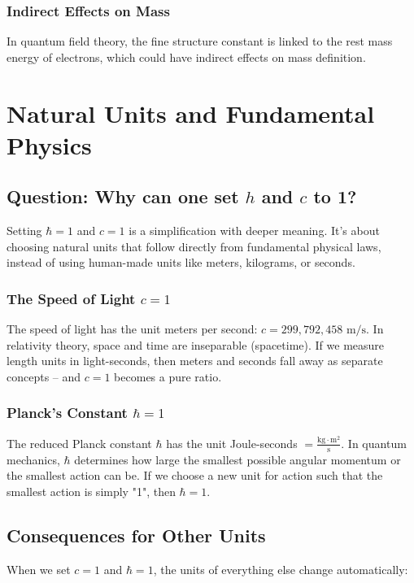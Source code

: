 \documentclass{article}
\begin{document}
\subsubsection{Indirect Effects on Mass}
In quantum field theory, the fine structure constant is linked to the rest mass energy of electrons, which could have indirect effects on mass definition.

\section{Natural Units and Fundamental Physics}

\subsection{Question: Why can one set $h$ and $c$ to 1?}

Setting $\hbar = 1$ and $c = 1$ is a simplification with deeper meaning. It's about choosing natural units that follow directly from fundamental physical laws, instead of using human-made units like meters, kilograms, or seconds.

\subsubsection{The Speed of Light $c = 1$}
The speed of light has the unit meters per second: $c = 299,792,458 \text{ m/s}$. In relativity theory, space and time are inseparable (spacetime). If we measure length units in light-seconds, then meters and seconds fall away as separate concepts – and $c = 1$ becomes a pure ratio.

\subsubsection{Planck's Constant $\hbar = 1$}
The reduced Planck constant $\hbar$ has the unit Joule-seconds $= \frac{\text{kg} \cdot \text{m}^2}{\text{s}}$. In quantum mechanics, $\hbar$ determines how large the smallest possible angular momentum or the smallest action can be. If we choose a new unit for action such that the smallest action is simply "1", then $\hbar = 1$.

\subsection{Consequences for Other Units}
When we set $c = 1$ and $\hbar = 1$, the units of everything else change automatically:
\end{document}
